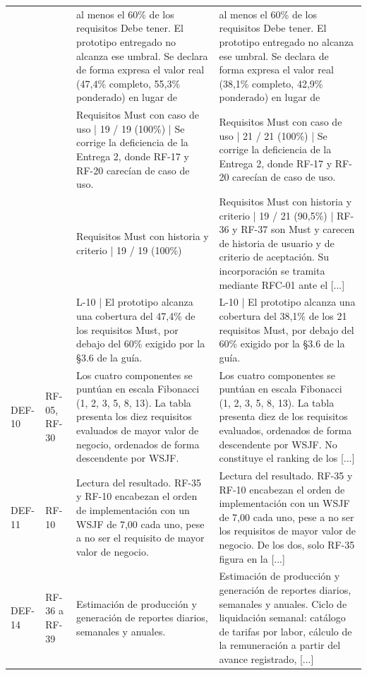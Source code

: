\documentclass[11pt,letterpaper]{article}
\begin{document}
{\begin{longtable}{p{1.35cm} p{2.1cm} p{5.4cm} p{5.4cm}}
 &  & al menos el 60\% de los requisitos Debe tener. El prototipo entregado no alcanza ese umbral. Se declara de forma expresa el valor real (47,4\% completo, 55,3\% ponderado) en lugar de & al menos el 60\% de los requisitos Debe tener. El prototipo entregado no alcanza ese umbral. Se declara de forma expresa el valor real (38,1\% completo, 42,9\% ponderado) en lugar de\\
 &  & Requisitos Must con caso de uso | 19 / 19 (100\%) | Se corrige la deficiencia de la Entrega 2, donde RF-17 y RF-20 carecían de caso de uso. & Requisitos Must con caso de uso | 21 / 21 (100\%) | Se corrige la deficiencia de la Entrega 2, donde RF-17 y RF-20 carecían de caso de uso.\\
 &  & Requisitos Must con historia y criterio | 19 / 19 (100\%) & Requisitos Must con historia y criterio | 19 / 21 (90,5\%) | RF-36 y RF-37 son Must y carecen de historia de usuario y de criterio de aceptación. Su incorporación se tramita mediante RFC-01 ante el [...]\\
 &  & L-10 | El prototipo alcanza una cobertura del 47,4\% de los requisitos Must, por debajo del 60\% exigido por la \S 3.6 de la guía. & L-10 | El prototipo alcanza una cobertura del 38,1\% de los 21 requisitos Must, por debajo del 60\% exigido por la \S 3.6 de la guía.\\
DEF-10 & RF-05, RF-30 & Los cuatro componentes se puntúan en escala Fibonacci (1, 2, 3, 5, 8, 13). La tabla presenta los diez requisitos evaluados de mayor valor de negocio, ordenados de forma descendente por WSJF. & Los cuatro componentes se puntúan en escala Fibonacci (1, 2, 3, 5, 8, 13). La tabla presenta diez de los requisitos evaluados, ordenados de forma descendente por WSJF. No constituye el ranking de los [...]\\
DEF-11 & RF-10 & Lectura del resultado. RF-35 y RF-10 encabezan el orden de implementación con un WSJF de 7,00 cada uno, pese a no ser el requisito de mayor valor de negocio. & Lectura del resultado. RF-35 y RF-10 encabezan el orden de implementación con un WSJF de 7,00 cada uno, pese a no ser los requisitos de mayor valor de negocio. De los dos, solo RF-35 figura en la [...]\\
DEF-14 & RF-36 a RF-39 & Estimación de producción y generación de reportes diarios, semanales y anuales. & Estimación de producción y generación de reportes diarios, semanales y anuales. Ciclo de liquidación semanal: catálogo de tarifas por labor, cálculo de la remuneración a partir del avance registrado, [...]\\

\end{longtable}}
\end{document}
